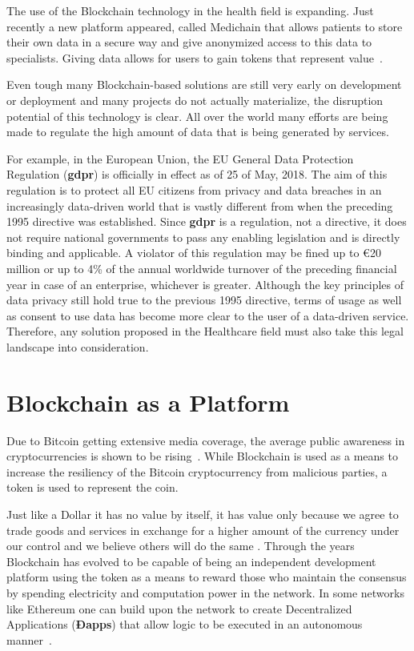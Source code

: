 The use of the Blockchain technology in the health field is expanding. Just
recently a new platform appeared, called Medichain that allows patients to
store their own data in a secure way and give anonymized access to this data to
specialists. Giving data allows for users to gain tokens that represent
value~\cite{MediChain2018}.

Even tough many Blockchain-based solutions are still very early on development
or deployment and many projects do not actually materialize, the disruption
potential of this technology is clear. All over the world many efforts are
being made to regulate the high amount of data that is being generated by
services.

For example, in the European Union, the EU General Data Protection Regulation
(\textbf{gdpr}) is officially in effect as of 25 of May, 2018. The aim of this
regulation is to protect all EU citizens from privacy and data breaches in an
increasingly data-driven world that is vastly different from when the preceding
1995 directive was established. Since \textbf{gdpr} is a regulation, not a
directive, it does not require national governments to pass any enabling
legislation and is directly binding and applicable. A violator of this
regulation may be fined up to €20 million or up to 4\% of the annual worldwide
turnover of the preceding financial year in case of an enterprise, whichever is
greater. Although the key principles of data privacy still hold true to the
previous 1995 directive, terms of usage as well as consent to use data has
become more clear to the user of a data-driven service. Therefore, any solution
proposed in the Healthcare field must also take this legal landscape into
consideration.

\section{Blockchain as a Platform}

Due to Bitcoin getting extensive media coverage, the average public awareness
in cryptocurrencies is shown to be rising~\cite{BitAwareness2017}. While
Blockchain is used as a means to increase the resiliency of the Bitcoin
cryptocurrency from malicious parties, a token is used to represent the coin. 

Just like a Dollar it has no value by itself, it has value only because we
agree to trade goods and services in exchange for a higher amount of the
currency under our control and we believe others will do the same
\cite{aliessi2016}. Through the years Blockchain has evolved to be capable of
being an independent development platform using the token as a means to reward
those who maintain the consensus by spending electricity and computation power
in the network. In some networks like Ethereum one can build upon the network
to create Decentralized Applications (\textbf{Ðapps}) that allow logic to be
executed in an autonomous manner~\cite{Wood2017}. 

